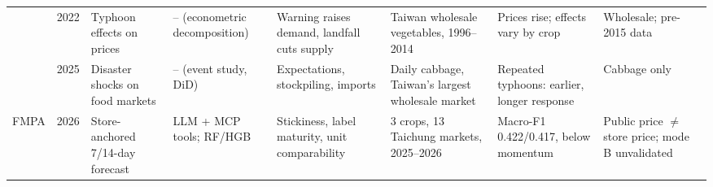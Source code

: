 \begin{table}[t]
\begin{tabularx}{\textwidth}{@{}l c Y Y Y Y Y Y@{}}
\cite{yu2022market} & 2022 & Typhoon effects on prices & -- (econometric decomposition) & Warning raises demand, landfall cuts supply & Taiwan wholesale vegetables, 1996--2014 & Prices rise; effects vary by crop & Wholesale; pre-2015 data \\
\cite{su2025food} & 2025 & Disaster shocks on food markets & -- (event study, DiD) & Expectations, stockpiling, imports & Daily cabbage, Taiwan's largest wholesale market & Repeated typhoons: earlier, longer response & Cabbage only \\
\midrule
FMPA & 2026 & Store-anchored 7/14-day forecast & LLM + MCP tools; RF/HGB & Stickiness, label maturity, unit comparability & 3 crops, 13 Taichung markets, 2025--2026 & Macro-F1 0.422/0.417, below momentum & Public price $\neq$ store price; mode B unvalidated \\
\bottomrule
\end{tabularx}
\end{table}
